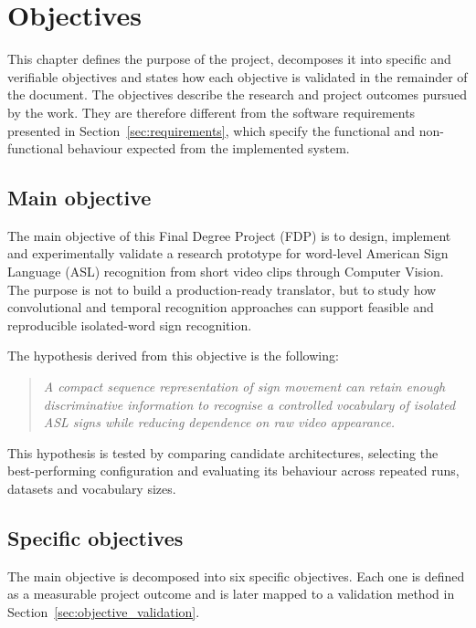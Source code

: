 \chapter{Objectives}
\setcounter{section}{0}

This chapter defines the purpose of the project, decomposes it into specific and verifiable
objectives and states how each objective is validated in the remainder of the document. The
objectives describe the research and project outcomes pursued by the work. They are therefore
different from the software requirements presented in Section~\ref{sec:requirements}, which specify
the functional and non-functional behaviour expected from the implemented system.

\section{Main objective}

The main objective of this Final Degree Project (FDP) is to design, implement and experimentally
validate a research prototype for word-level American Sign Language (ASL) recognition from short
video clips through Computer Vision. The purpose is not to build a production-ready translator, but
to study how convolutional and temporal recognition approaches can support feasible and
reproducible isolated-word sign recognition.

The hypothesis derived from this objective is the following:

\begin{quote}
    \itshape
    A compact sequence representation of sign movement can retain enough discriminative
    information to recognise a controlled vocabulary of isolated ASL signs while reducing
    dependence on raw video appearance.
\end{quote}

This hypothesis is tested by comparing candidate architectures, selecting the best-performing
configuration and evaluating its behaviour across repeated runs, datasets and vocabulary sizes.

\section{Specific objectives}

The main objective is decomposed into six specific objectives. Each one is defined as a measurable
project outcome and is later mapped to a validation method in
Section~\ref{sec:objective_validation}.

